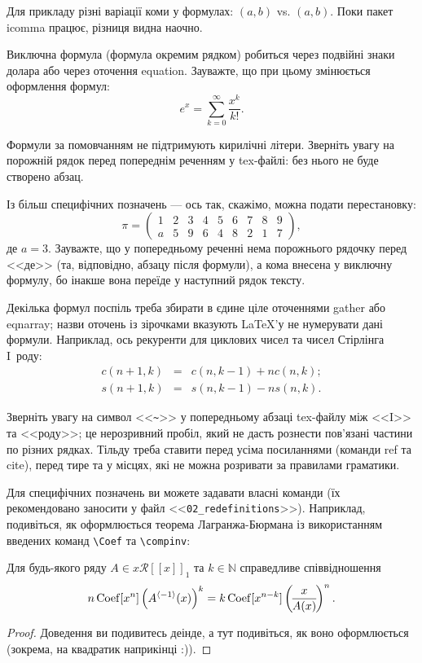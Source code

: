 Для прикладу різні варіації коми у формулах: $(a, b)$ vs. $(a,b)$. Поки 
пакет icomma працює, різниця видна наочно.

Виключна формула (формула окремим рядком) робиться через подвійні знаки 
долара або через оточення equation. Зауважте, що при цьому змінюється 
оформлення формул:
$$e^x = \sum_{k = 0}^{\infty} {\frac{x^k}{k!}}.$$

Формули за помовчанням не підтримують кирилічні літери. Зверніть увагу на 
порожній рядок перед попереднім реченням у tex-файлі: без нього не буде 
створено абзац.

Із більш специфічних позначень --- ось так, скажімо, можна подати 
перестановку:
$$\pi = \begin{pmatrix}
1 & 2 & 3 & 4 & 5 & 6 & 7 & 8 & 9\\
a & 5 & 9 & 6 & 4 & 8 & 2 & 1 & 7
\end{pmatrix},$$
де $a=3$. Зауважте, що у попередньому реченні нема порожнього рядочку 
перед <<де>> (та, відповідно, абзацу після формули), а кома внесена у 
виключну формулу, бо інакше вона переїде у наступний рядок тексту.

Декілька формул поспіль треба збирати в єдине ціле оточеннями gather або 
eqnarray; назви оточень із зірочками вказують \LaTeX'у не нумерувати дані 
формули. Наприклад, ось рекуренти для циклових чисел та чисел Стірлінга 
I~роду:
\begin{eqnarray*}
c(n+1, k) &=& c(n, k-1)+nc(n, k); \\
s(n+1, k) &=& s(n, k-1)-ns(n, k).
\end{eqnarray*}

Зверніть увагу на символ <<\verb|~|>> у попередньому абзаці tex-файлу між 
<<I>> та <<роду>>; це нерозривний пробіл, який не дасть рознести пов'язані 
частини по різних рядках. Тільду треба ставити перед усіма посиланнями 
(команди ref та cite), перед тире та у місцях, які не можна розривати за 
правилами граматики.

Для специфічних позначень ви можете задавати власні команди (їх 
рекомендовано заносити у файл <<\verb|02_redefinitions|>>). Наприклад, 
подивіться, як оформлюється теорема Лагранжа-Бюрмана із використанням 
введених команд \verb|\Coef| та \verb|\compinv|:

\begin{theorem} \label{thLagrangeBurmann}
Для будь-якого ряду $A \in x \mathcal R[[x]]_1$ та $k \in \mathbb N$ справедливе співвідношення
$$n \operatorname{Coef}[x^n] \left( A^{\left\langle -1 \right\rangle}(x) \right)^k = k \operatorname{Coef}[x^{n-k}] \left(\! \frac{x}{A(x)} \!\right)^n.$$
\end{theorem}
\begin{proof}
Доведення ви подивитесь деінде, а тут подивіться, як воно оформлюється 
(зокрема, на квадратик наприкінці :)).                                                                                       
\end{proof}

